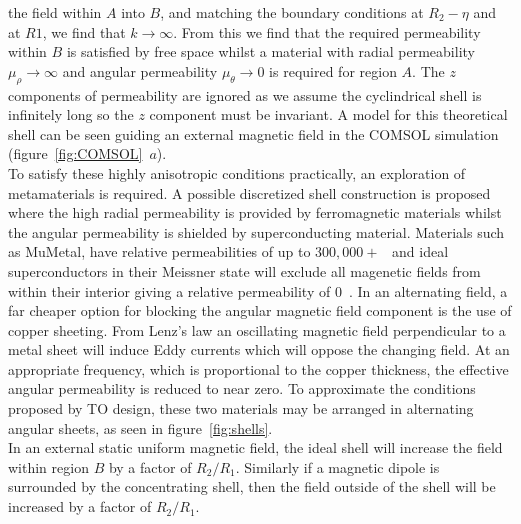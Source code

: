 \documentclass[11pt]{iopart}
\begin{document}
the field within $A$ into $B$, and matching the boundary conditions at
$R_2-\eta$ and at $R1$, we find that $k \rightarrow \infty$. From this
we find that the required permeability within $B$ is satisfied by free
space whilst a material with radial permeability $\mu_\rho \rightarrow
\infty$ and angular permeability $\mu_\theta \rightarrow 0$ is
required for region $A$. The $z$ components of permeability are ignored
as we assume the cyclindrical shell is
infinitely long so the $z$ component must be invariant. A model for
this theoretical shell can be seen guiding an external magnetic field
in the COMSOL simulation (figure~\ref{fig:COMSOL}~$a$).\\ To satisfy
these highly anisotropic conditions practically, an exploration of
metamaterials is required. A possible discretized shell construction
is proposed~\cite{PRATT} where the high radial permeability is
provided by ferromagnetic materials whilst the angular permeability is
shielded by superconducting material. Materials such as MuMetal, have
relative permeabilities of up to $300,000+$~\cite{MUMETAL} and ideal
superconductors in their Meissner state will exclude all magenetic
fields from within their interior giving a relative permeability of
$0$~\cite{Meissner}. In an alternating field, a far cheaper option for
blocking the angular magnetic field component is the use of copper
sheeting. From Lenz's law an oscillating magnetic field perpendicular
to a metal sheet will induce Eddy currents which will oppose the
changing field. At an appropriate frequency, which is proportional to
the copper thickness, the effective angular permeability is reduced to
near zero. To approximate the conditions proposed by TO design, these
two materials may be arranged in alternating angular sheets, as seen
in figure~\ref{fig:shells}. \\ In an external static uniform magnetic
field, the ideal shell will increase the field within region $B$ by a
factor of $R_2/R_1$. Similarly if a magnetic dipole is surrounded by
the concentrating shell, then the field outside of the shell will be
increased by a factor of $R_2/R_1$. \\
\end{document}
